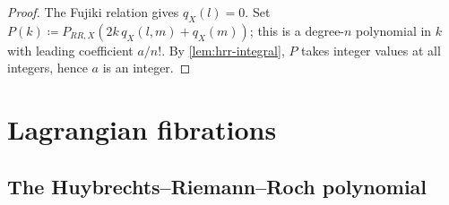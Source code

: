\begin{proof}
  The Fujiki relation gives \(q_X(l) = 0\).  Set
  \(P(k) \coloneqq P_{RR,X}(2k\,q_X(l,m) + q_X(m))\); this is a degree-\(n\) polynomial
  in \(k\) with leading coefficient \(a/n!\).
  By \cref{lem:hrr-integral}, \(P\) takes integer values at all integers, hence \(a\) is
  an integer.
\end{proof}

\section{Lagrangian fibrations}

\subsection{The Huybrechts--Riemann--Roch polynomial}

